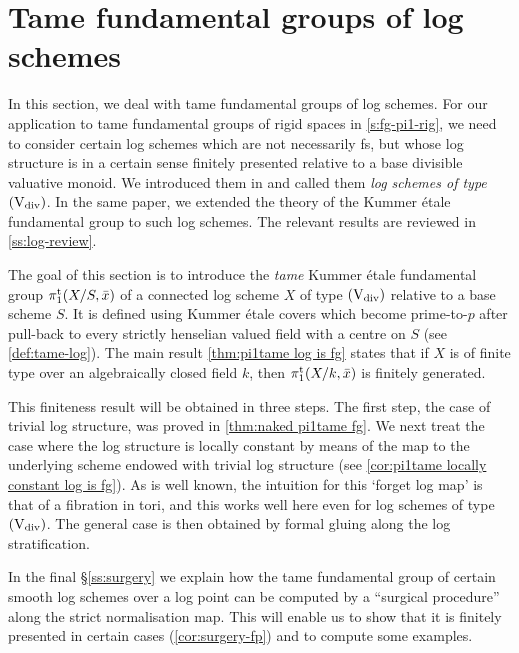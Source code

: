 \section{Tame fundamental groups of log schemes}
\label{s:fg-pi1-log}
In this section, we deal with tame fundamental groups of log schemes. For our application to tame fundamental groups of rigid spaces in \cref{s:fg-pi1-rig}, we need to consider certain log schemes which are not necessarily fs, but whose log structure is in a certain sense finitely presented relative to a base divisible valuative monoid. We introduced them in \cite{AHLS-Log} and called them \emph{log schemes of type $(\mathrm{V}_{\rm div})$}. In the same paper, we extended the theory of the Kummer \'etale fundamental group to such log schemes. The relevant results are reviewed in \cref{ss:log-review}. 

The goal of this section is to introduce the \emph{tame} Kummer \'etale fundamental group $\pi_1^{\mathrm{t}}(X/S, \bar x)$ of a connected log scheme $X$ of type $(\mathrm{V}_{\rm div})$ relative to a base scheme $S$. It is defined using Kummer \'etale covers which become prime-to-$p$ after pull-back to every strictly henselian valued field with a centre on $S$ (see \cref{def:tame-log}). The main result \cref{thm:pi1tame log is fg} states that if $X$ is of finite type over an algebraically closed field $k$, then $\pi_1^{\mathrm{t}}(X/k, \bar x)$ is finitely generated.

This finiteness result will be obtained in three steps. The first step, the case of trivial log structure, was proved in \cref{thm:naked pi1tame fg}. We next treat the case where the log structure is locally constant by means of the map to the underlying scheme endowed with trivial log structure (see \cref{cor:pi1tame locally constant log is fg}). As is well known, the intuition for this `forget log map' is that of a fibration in tori, and this works well here even for log schemes of type $(\mathrm{V}_{\rm div})$. The general case is then obtained by formal gluing along the log stratification.

In the final \S\ref{ss:surgery} we explain how the tame fundamental group of certain smooth log schemes over a log point can be computed by a ``surgical procedure'' along the strict normalisation map. This will enable us to show that it is finitely presented in certain cases (\cref{cor:surgery-fp}) and to compute some examples.


